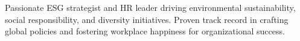 

\begin{cvparagraph}

Passionate ESG strategist and HR leader driving environmental sustainability, social responsibility, and diversity initiatives. Proven track record in crafting global policies and fostering workplace happiness for organizational success.
\end{cvparagraph}
